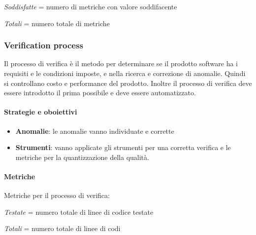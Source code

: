 \textit{Soddisfatte} = numero di metriche con valore soddifacente

\textit{Totali} = numero totale di metriche
 
            \newpage
            \subsubsection{Verification process}
            Il processo di verifica è il metodo per determinare se il prodotto software ha i requisiti e le condizioni imposte, e nella ricerca e correzione di anomalie. Quindi si controllano costo e performance del prodotto. Inoltre il processo di verifica deve essere introdotto il prima possibile e deve essere automatizzato.
            
            \paragraph{Strategie e oboiettivi}
            \begin{itemize}
                \item \textbf{Anomalie}: le anomalie vanno individuate e corrette
                \item \textbf{Strumenti}: vanno applicate gli strumenti per una corretta verifica e le metriche per la quantizzazione della qualità.
            \end{itemize}
            
            \paragraph{Metriche}
            Metriche per il processo di verifica:
            
            \def\productquality{
                {   Code coverage,
                    $\frac{Testate}{Totali}$,
                    $ 75 \%$,
                    $ 100 \% $
                },
                {   Numero di test superati,
                    numero intero,
                    = numero totale di test,
                    = numero totale di test
                },
            }


\textit{Testate} = numero totale di linee di codice testate

\textit{Totali} = numero totale di linee di codi